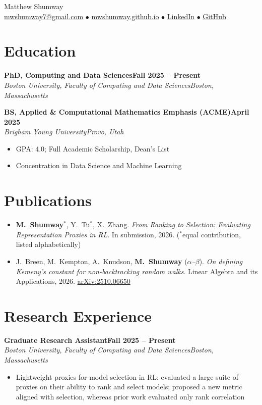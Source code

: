 \documentclass[10.5pt,letterpaper]{article}
\newcommand{\entry}[4]{%
  \textbf{#1}\hfill\textbf{#2}\\
  \textit{#3}\hfill\textit{#4}\par}
\begin{document}
\begin{center}
  {\LARGE Matthew Shumway}\\[3pt]
  \href{mailto:mwshumway7@gmail.com}{mwshumway7@gmail.com} $\bullet$
  \href{https://mwshumway.github.io}{mwshumway.github.io} $\bullet$
  \href{https://www.linkedin.com/in/matthew-shumway7/}{LinkedIn} $\bullet$
  \href{https://github.com/mwshumway/}{GitHub}
\end{center}

\section*{Education}
\entry{PhD, Computing and Data Sciences}{Fall 2025 -- Present}
      {Boston University, Faculty of Computing and Data Sciences}{Boston, Massachusetts}

\vspace{4pt}
\entry{BS, Applied \& Computational Mathematics Emphasis (ACME)}{April 2025}
      {Brigham Young University}{Provo, Utah}
\begin{itemize}
  \item GPA: 4.0; Full Academic Scholarship, Dean's List
  \item Concentration in Data Science and Machine Learning
\end{itemize}

\section*{Publications}
\begin{itemize}[leftmargin=0pt,label={},itemsep=4pt]
  \item \textbf{M.~Shumway}$^{*}$, Y.~Tu$^{*}$, X.~Zhang.
        \textit{From Ranking to Selection: Evaluating Representation Proxies in RL}.
        In submission, 2026. ($^{*}$equal contribution, listed alphabetically)
  \item J.~Breen, M.~Kempton, A.~Knudson, \textbf{M.~Shumway} (\textit{$\alpha$--$\beta$}).
        \textit{On defining Kemeny's constant for non-backtracking random walks}.
        Linear Algebra and its Applications, 2026.
        \href{https://arxiv.org/abs/2510.06650}{arXiv:2510.06650}
\end{itemize}

\section*{Research Experience}
\entry{Graduate Research Assistant}{Fall 2025 -- Present}
      {Boston University, Faculty of Computing and Data Sciences}{Boston, Massachusetts}
\begin{itemize}
  \item Lightweight proxies for model selection in RL: evaluated a large suite of proxies on their ability to rank and select models; proposed a new metric aligned with selection, whereas prior work evaluated only rank correlation
\end{itemize}
\end{document}
